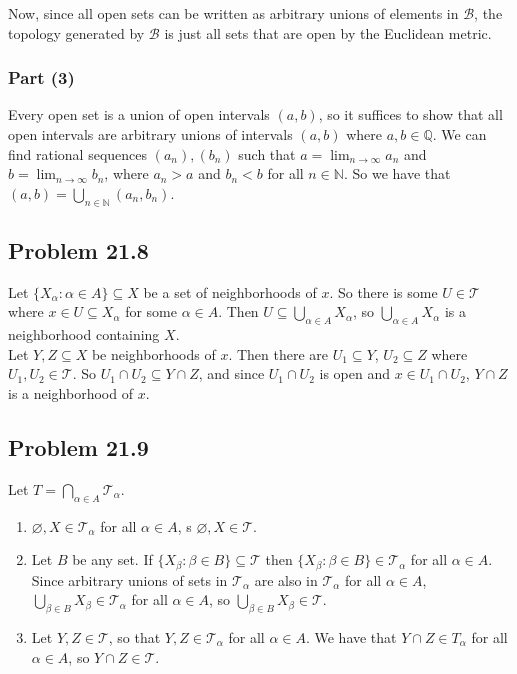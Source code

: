 \documentclass{article}
\newcommand{\N}{\mathbb{N}}
\newcommand{\Q}{\mathbb{Q}}
\newcommand{\T}{\mathcal{T}}
\newcommand{\B}{\mathcal{B}}
\newcommand{\nullset}{\varnothing}
\begin{document}
Now, since all open sets can be written as arbitrary unions of elements in $\B$, the topology generated by $\B$ is just all sets that are open by the Euclidean metric. \\

\subsubsection*{Part (3)}
Every open set is a union of open intervals $(a, b)$, so it suffices to show that all open intervals are arbitrary unions of intervals $(a, b)$ where $a, b \in \Q$. We can find rational sequences $(a_n), (b_n)$ such that $a = \lim_{n\to\infty} a_n$ and $b = \lim_{n\to\infty} b_n$, where $a_n > a$ and $b_n < b$ for all $n \in \N$. So we have that $(a, b) = \bigcup_{n \in \N} (a_n, b_n)$.

\subsection*{Problem 21.8}
Let $\{X_\alpha : \alpha \in A\} \subseteq X$ be a set of neighborhoods of $x$. So there is some $U \in \T$ where $x \in U \subseteq X_\alpha$ for some $\alpha \in A$. Then $U \subseteq \bigcup_{\alpha \in A} X_\alpha$, so $\bigcup_{\alpha \in A} X_\alpha$ is a neighborhood containing $X$. \\

Let $Y, Z \subseteq X$ be neighborhoods of $x$. Then there are $U_1 \subseteq Y$, $U_2 \subseteq Z$ where $U_1, U_2 \in \T$. So $U_1 \cap U_2 \subseteq Y \cap Z$, and since $U_1\cap U_2$ is open and $x \in U_1 \cap U_2$, $Y\cap Z$ is a neighborhood of $x$.

\subsection*{Problem 21.9}
Let $T = \bigcap_{\alpha \in A} \T_\alpha$.
\begin{enumerate}
    \item $\nullset, X \in \T_\alpha$ for all $\alpha \in A$, s $\nullset, X \in \T$.
    \item Let $B$ be any set. If $\{X_\beta: \beta \in B\} \subseteq \T$ then $\{X_\beta: \beta \in B\} \in \T_\alpha$ for all $\alpha \in A$. Since arbitrary unions of sets in $\T_\alpha$ are also in $\T_\alpha$ for all $\alpha \in A$, $\bigcup_{\beta \in B} X_\beta \in \T_\alpha$ for all $\alpha \in A$, so $\bigcup_{\beta \in B} X_\beta \in \T$.
    \item Let $Y, Z \in \T$, so that $Y, Z \in \T_\alpha$ for all $\alpha \in A$. We have that $Y \cap Z \in T_\alpha$ for all $\alpha \in A$, so $Y \cap Z \in \T$.
\end{enumerate}
\end{document}
